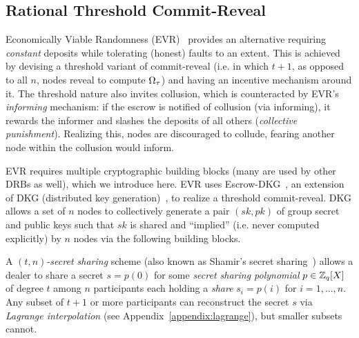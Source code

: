 \subsection{Rational Threshold Commit-Reveal}
Economically Viable Randomness (EVR)~\cite{david2020economically} provides an alternative requiring \textit{constant} deposits while tolerating (honest) faults to an extent. This is achieved by devising a threshold variant of commit-reveal (i.e. in which $t + 1$, as opposed to all $n$, nodes reveal to compute $\Omega_\tau$) and having an incentive mechanism around it. The threshold nature also invites collusion, which is counteracted by EVR's \textit{informing} mechanism: if the escrow is notified of collusion (via informing), it rewards the informer and slashes the deposits of all others (\textit{collective punishment}). Realizing this, nodes are discouraged to collude, fearing another node within the collusion would inform.

EVR requires multiple cryptographic building blocks (many are used by other DRBs as well), which we introduce here. EVR uses Escrow-DKG~\cite{david2019rational}, an extension of DKG (distributed key generation)~\cite{pedersen1991threshold,gennaro1999secure}, to realize a threshold commit-reveal. DKG allows a set of $n$ nodes to collectively generate a pair $(sk, pk)$ of group secret and public keys such that $sk$ is shared and ``implied'' (i.e. never computed explicitly) by $n$ nodes via the following building blocks.

\begin{definition}
A \textit{$(t, n)$-secret sharing} scheme (also known as Shamir's secret sharing~\cite{shamir1979share}) allows a dealer to share a secret $s = p(0)$ for some \textit{secret sharing polynomial} $p \in \mathbb{Z}_q[X]$ of degree $t$ among $n$ participants each holding a \textit{share} $s_i = p(i)$ for $i = 1, ..., n$. Any subset of $t + 1$ or more participants can reconstruct the secret $s$ via \textit{Lagrange interpolation} (see Appendix~\ref{appendix:lagrange}), but smaller subsets cannot.
\end{definition}

